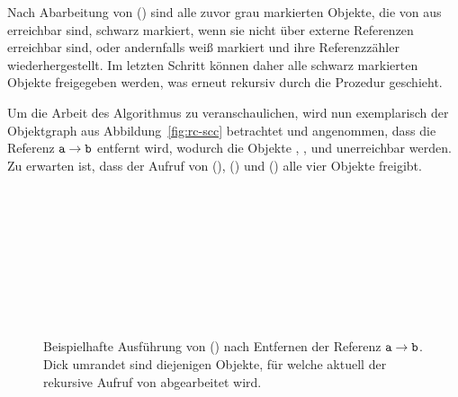 Nach Abarbeitung von () sind alle zuvor grau markierten Objekte, die von  aus erreichbar sind, schwarz markiert, wenn sie nicht über externe Referenzen erreichbar sind, oder andernfalls weiß markiert und ihre Referenzzähler wiederhergestellt.
Im letzten Schritt können daher alle schwarz markierten Objekte freigegeben werden, was erneut rekursiv durch die Prozedur  geschieht.

Um die Arbeit des Algorithmus zu veranschaulichen, wird nun exemplarisch der Objektgraph aus Abbildung~\ref{fig:rc-scc} betrachtet und angenommen, dass die Referenz $\texttt{a} \rightarrow \texttt{b}$ entfernt wird, wodurch die Objekte , ,  und  unerreichbar werden.
Zu erwarten ist, dass der Aufruf von (), () und () alle vier Objekte freigibt.

\newpage

\begin{figure}[h]
	\centering
	\begin{subfigure}{0.4\textwidth}
		\centering
		
	\end{subfigure}~\hspace{0.5cm}~
	\begin{subfigure}{0.4\textwidth}
		\centering
		
	\end{subfigure}\\[1cm]
	\begin{subfigure}{0.4\textwidth}
		\centering
		
	\end{subfigure}~\hspace{0.5cm}~
	\begin{subfigure}{0.4\textwidth}
		\centering
		
	\end{subfigure}\\[1cm]
	\begin{subfigure}{0.4\textwidth}
		\centering
		
	\end{subfigure}~\hspace{0.5cm}~
	\begin{subfigure}{0.4\textwidth}
		\centering
		
	\end{subfigure}
	\caption[Ausführung von ()]{Beispielhafte Ausführung von () nach Entfernen der Referenz $\texttt{a} \rightarrow \texttt{b}$. Dick umrandet sind diejenigen Objekte, für welche aktuell der rekursive Aufruf von  abgearbeitet wird.}
	\label{fig:rc-markgray-example}
\end{figure}

